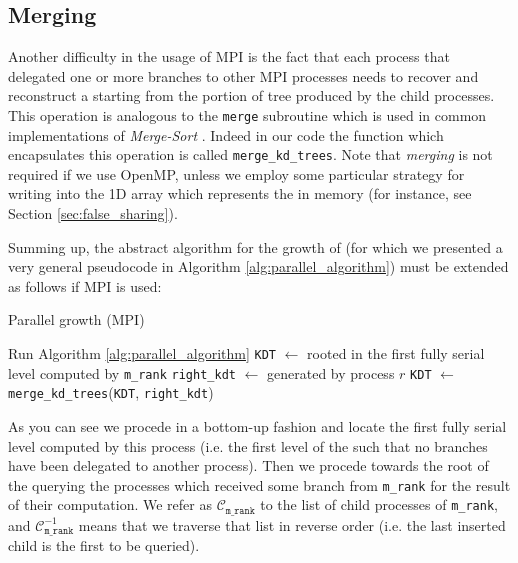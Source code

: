 \documentclass{article}
\begin{document}
\subsection{Merging}
Another difficulty in the usage of MPI is the fact that each process that
delegated one or more branches to other MPI processes needs to recover and
reconstruct a \kdtree{} starting from the portion of tree produced by the child
processes. This operation is analogous to the \texttt{merge} subroutine which is
used in common implementations of \emph{Merge-Sort}
\cite{cormen2009introduction}. Indeed in our code the function which
encapsulates this operation is called \texttt{merge\_kd\_trees}. Note that
\emph{merging} is not required if we use OpenMP, unless we employ some
particular strategy for writing into the 1D array which represents the
\kdtree{} in memory (for instance, see Section \ref{sec:false_sharing}).

Summing up, the abstract algorithm for the growth of \kdtree{} (for which we
presented a very general pseudocode in Algorithm \ref{alg:parallel_algorithm})
must be extended as follows if MPI is used:

\begin{algorithm}[H]
    \SetAlgoLined
    \caption{Parallel \kdtree{} growth (MPI)}\label{alg:parallel_algorithm_mpi}
    Run Algorithm \ref*{alg:parallel_algorithm}\;
    \texttt{KDT} $\gets$ \kdtree{} rooted in the first fully serial level computed by \texttt{m\_rank}\;
        {
            \texttt{right\_kdt} $\gets$ \kdtree{} generated by process $r$\;
            \texttt{KDT} $\gets$ \texttt{merge\_kd\_trees}(\texttt{KDT}, \texttt{right\_kdt})\;
        }
\end{algorithm}

As you can see we procede in a bottom-up fashion and locate the first fully
serial level computed by this process (i.e. the first level of the \kdtree{}
such that no branches have been delegated to another process). Then we procede
towards the root of the \kdtree{} querying the processes which received some
branch from \texttt{m\_rank} for the result of their computation. We refer as
$\mathcal{C}_{\texttt{m\_rank}}$ to the list of child processes of
\texttt{m\_rank}, and $\mathcal{C}_{\texttt{m\_rank}}^{-1}$ means that we
traverse that list in reverse order (i.e. the last inserted child is the first
to be queried).
\end{document}
